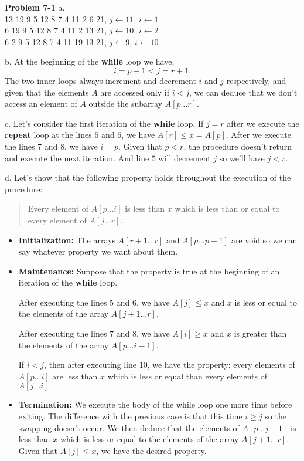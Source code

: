 \documentclass[a4paper,12pt]{article}
\newcommand{\newprob}[1]
{\bigskip \noindent \textbf{Problem #1} \newline}
\newcommand{\subpar}[1]{\medskip \noindent #1.}
\begin{document}
\newprob{7-1}
\subpar{a}\\
13 19 9 5 12 8 7 4 11 2 6 21, $j \leftarrow 11$, $i \leftarrow 1$ \\
6 19 9 5 12 8 7 4 11 2 13 21, $j \leftarrow 10$, $i \leftarrow 2$ \\
6 2 9 5 12 8 7 4 11 19 13 21, $j \leftarrow 9$, $i \leftarrow 10$

\subpar{b} At the beginning of the \textbf{while} loop we have,
\[ i = p-1 < j=r+1.\]
The two inner loops always increment and decrement $i$ and $j$
respectively, and given that the elements $A$ are accessed only if $i
< j$, we can deduce that we don't access an element of $A$ outside the
subarray $A[p\ldots r]$.

\subpar{c} Let's consider the first iteration of the \textbf{while}
loop.  If $j = r$ after we execute the \textbf{repeat} loop at the
lines $5$ and $6$,  we have $A[r] \le x = A[p]$.  After we execute the
lines $7$ and $8$, we have $i = p$.  Given that $p < r$, the procedure
doesn't return and execute the next iteration.  And line $5$ will
decrement $j$ so we'll have $j < r$.

\subpar{d} Let's show that the following property holds throughout the
execution of the procedure:

\begin{quote}
  Every element of $A[p\ldots i]$ is less than $x$ which is less than
  or equal to every element of $A[j\ldots r]$.
\end{quote}

\begin{itemize}

\item \textbf{Initialization: } The arrays $A[r+1\ldots r]$ and
  $A[p\ldots p-1]$ are void so we can say whatever property we want
  about them.

\item \textbf{Maintenance: } Suppose that the property is true at the
  beginning of an iteration of the \textbf{while} loop.

  After executing the lines $5$ and $6$, we have $A[j] \le x$ and $x$
  is less or equal to the elements of the array $A[j+1\ldots r]$.

  After executing the lines $7$ and $8$, we have $A[i] \ge x$ and $x$
  is greater than the elements of the array $A[p\ldots i-1]$.

  If $i < j$, then after executing line $10$, we have the property:
  every elements of $A[p\ldots i]$ are less than $x$ which is less or
  equal than every elements of $A[j\ldots i]$

  \item \textbf{Termination: } We execute the body of the while loop
    one more time before exiting.  The difference with the previous
    case is that this time $i \ge j$ so the swapping doesn't occur.
    We then deduce that the elements of $A[p\ldots j-1]$ is less than
    $x$ which is less or equal to the elements of the array
    $A[j+1\ldots r]$.  Given that $A[j] \le x$,  we have the desired
      property.
\end{itemize}
\end{document}
